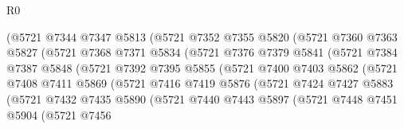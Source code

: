\begin{lexlean}{R0}
\begin{coremodule}
                        (@5721
                          @7344
                          @7347
                          @5813
                          (@5721
                            @7352
                            @7355
                            @5820
                            (@5721
                              @7360
                              @7363
                              @5827
                              (@5721
                                @7368
                                @7371
                                @5834
                                (@5721
                                  @7376
                                  @7379
                                  @5841
                                  (@5721
                                    @7384
                                    @7387
                                    @5848
                                    (@5721
                                      @7392
                                      @7395
                                      @5855
                                      (@5721
                                        @7400
                                        @7403
                                        @5862
                                        (@5721
                                          @7408
                                          @7411
                                          @5869
                                          (@5721
                                            @7416
                                            @7419
                                            @5876
                                            (@5721
                                              @7424
                                              @7427
                                              @5883
                                              (@5721
                                                @7432
                                                @7435
                                                @5890
                                                (@5721
                                                  @7440
                                                  @7443
                                                  @5897
                                                  (@5721
                                                    @7448
                                                    @7451
                                                    @5904
                                                    (@5721
                                                      @7456

\end{coremodule}
\end{lexlean}
